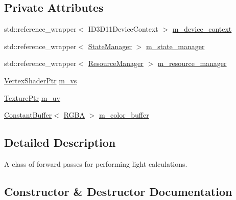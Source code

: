 \subsection*{Private Attributes}
\begin{DoxyCompactItemize}
\item 
std\+::reference\+\_\+wrapper$<$ I\+D3\+D11\+Device\+Context $>$ \mbox{\hyperlink{classmage_1_1rendering_1_1_forward_pass_a4bc03d77fd5a385a9c5878db8028dcc4}{m\+\_\+device\+\_\+context}}
\item 
std\+::reference\+\_\+wrapper$<$ \mbox{\hyperlink{classmage_1_1rendering_1_1_state_manager}{State\+Manager}} $>$ \mbox{\hyperlink{classmage_1_1rendering_1_1_forward_pass_a01d72a7d6be3f98806df7780c94916ff}{m\+\_\+state\+\_\+manager}}
\item 
std\+::reference\+\_\+wrapper$<$ \mbox{\hyperlink{classmage_1_1rendering_1_1_resource_manager}{Resource\+Manager}} $>$ \mbox{\hyperlink{classmage_1_1rendering_1_1_forward_pass_a2b0fe58480704725219acff176695819}{m\+\_\+resource\+\_\+manager}}
\item 
\mbox{\hyperlink{namespacemage_1_1rendering_aaf704b9c54a4181f4950a1761de69dda}{Vertex\+Shader\+Ptr}} \mbox{\hyperlink{classmage_1_1rendering_1_1_forward_pass_ae1483b1f37cd65efdf6059bcc7d1dd09}{m\+\_\+vs}}
\item 
\mbox{\hyperlink{namespacemage_1_1rendering_a6f3ae54f825328465b0cdde0f0de4a36}{Texture\+Ptr}} \mbox{\hyperlink{classmage_1_1rendering_1_1_forward_pass_ab2fcc28c086c7ddb6e13bfd5f9d994b9}{m\+\_\+uv}}
\item 
\mbox{\hyperlink{classmage_1_1rendering_1_1_constant_buffer}{Constant\+Buffer}}$<$ \mbox{\hyperlink{structmage_1_1_r_g_b_a}{R\+G\+BA}} $>$ \mbox{\hyperlink{classmage_1_1rendering_1_1_forward_pass_ace4259d7a292982a3f3111b24fcf7c51}{m\+\_\+color\+\_\+buffer}}
\end{DoxyCompactItemize}


\subsection{Detailed Description}
A class of forward passes for performing light calculations. 

\subsection{Constructor \& Destructor Documentation}
\mbox{\label{classmage_1_1rendering_1_1_forward_pass_aabff6394203f0927f65cd9d591eefa58}} 
